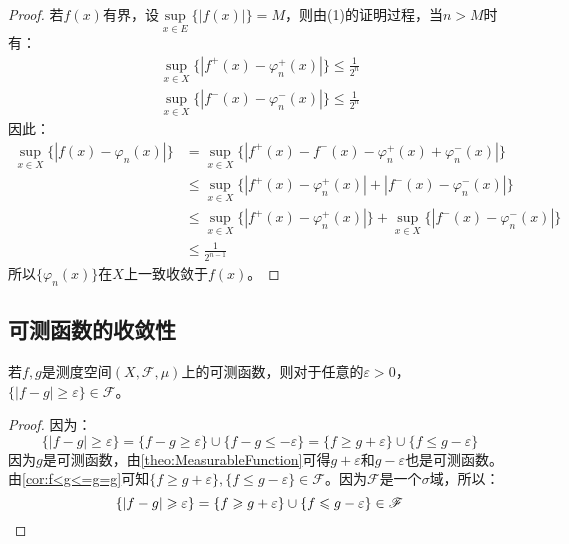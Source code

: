 \begin{proof}
	若$f(x)$有界，设$\sup\limits_{x\in E}\{|f(x)|\}=M$，则由(1)的证明过程，当$n>M$时有：
	\begin{gather*}
		\sup_{x\in X}\{|f^+(x)-\varphi_n^+(x)|\}\leqslant\frac{1}{2^n} \\
		\sup_{x\in X}\{|f^-(x)-\varphi_n^-(x)|\}\leqslant\frac{1}{2^n}
	\end{gather*}
	因此：
	\begin{align*}
		\sup_{x\in X}\{|f(x)-\varphi_n(x)|\}
		&=\sup_{x\in X}\{|f^+(x)-f^-(x)-\varphi_n^+(x)+\varphi_n^-(x)|\} \\
		&\leqslant\sup_{x\in X}\{|f^+(x)-\varphi_n^+(x)|+|f^-(x)-\varphi_n^-(x)|\} \\
		&\leqslant\sup_{x\in X}\{|f^+(x)-\varphi_n^+(x)|\}+\sup_{x\in X}\{|f^-(x)-\varphi_n^-(x)|\} \\
		&\leqslant\frac{1}{2^{n-1}}
	\end{align*}
	所以$\{\varphi_n(x)\}$在$X$上一致收敛于$f(x)$。
\end{proof}

\subsection{可测函数的收敛性}
\begin{lemma}\label{lem:|f-g|Measurable}
	若$f,g$是测度空间$(X,\mathscr{F},\mu)$上的可测函数，则对于任意的$\varepsilon>0$，$\{|f-g|\geqslant\varepsilon\}\in \mathscr{F}$。
\end{lemma}
\begin{proof}
	因为：
	\begin{equation*}
		\{|f-g|\geqslant\varepsilon\}=\{f-g\geqslant\varepsilon\}\cup\{f-g\leqslant-\varepsilon\}=\{f\geqslant g+\varepsilon\}\cup\{f\leqslant g-\varepsilon\}
	\end{equation*}
	因为$g$是可测函数，由\cref{theo:MeasurableFunction}可得$g+\varepsilon$和$g-\varepsilon$也是可测函数。由\cref{cor:f<g<=g=g}可知$\{f\geqslant g+\varepsilon\},\{f\leqslant g-\varepsilon\}\in\mathscr{F}$。因为$\mathscr{F}$是一个$\sigma$域，所以：
	\begin{equation*}
		\{|f-g|\geqslant\varepsilon\}=\{f\geqslant g+\varepsilon\}\cup\{f\leqslant g-\varepsilon\}\in \mathscr{F}\qedhere
	\end{equation*}
\end{proof}
